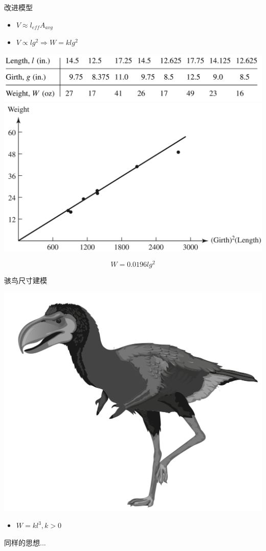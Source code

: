 \documentclass[UTF8, mathserif]{ctexbeamer}
\begin{document}
\begin{frame}{改进模型}
  \begin{itemize}
  \item $V \approx l_{eff}A_{avg}$
  \item $V \propto lg^2 \Rightarrow W = klg^2$
  \end{itemize}
  \begin{center}
    \includegraphics[width=.5\textwidth{}]{fishtab2.png}
    \includegraphics[width=.4\textwidth{}]{fishlen3.png}
  \end{center}
  \[
  W = 0.0196lg^2
  \]
\end{frame}

\begin{frame}{骇鸟尺寸建模}
  \begin{center}
    \includegraphics[width=.5\textwidth{}]{terror.png}
  \end{center}

  \begin{itemize}
  \item $W = kl^3, k>0$
  \end{itemize}

  同样的思想...
  
\end{frame}
\end{document}
